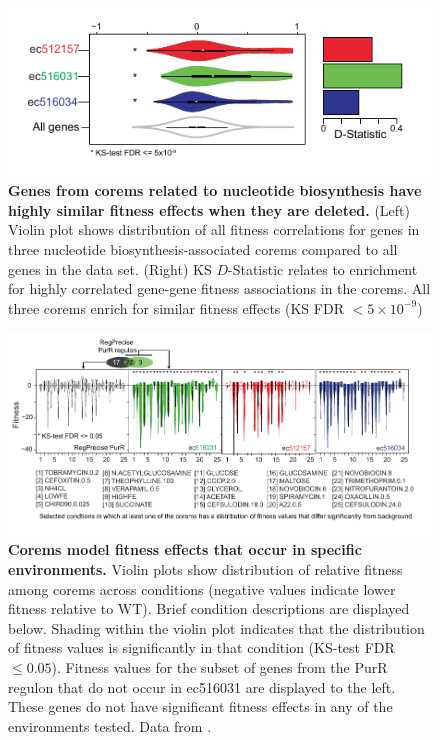\begin{figure}[hp]
\centering
\includegraphics[width=0.95\linewidth]{figures/purR_corem_fitness.pdf}
\caption[Genes from corems related to nucleotide biosynthesis have highly similar fitness effects when they are deleted]{\textbf{Genes from corems related to nucleotide biosynthesis have highly similar fitness effects when they are deleted.} (Left) Violin plot shows distribution of all fitness correlations for genes in three nucleotide biosynthesis-associated corems compared to all genes in the data set. (Right) KS $D$-Statistic relates to enrichment for highly correlated gene-gene fitness associations in the corems. All three corems enrich for similar fitness effects (KS FDR $< 5\times 10^{-9}$)}
\label{fig:purR_corem_fitness}
\end{figure}

\begin{figure}[hp]
\centering
\includegraphics[width=0.95\linewidth]{figures/purR_corem_fitness_specific.pdf}
\caption[Corems model fitness effects that occur in specific environments]{\textbf{Corems model fitness effects that occur in specific environments.} Violin plots show distribution of relative fitness among corems across conditions (negative values indicate lower fitness relative to WT). Brief condition descriptions are displayed below. Shading within the violin plot indicates that the distribution of fitness values is significantly in that condition (KS-test FDR $\leq 0.05$). Fitness values for the subset of genes from the PurR regulon that do not occur in ec516031 are displayed to the left. These genes do not have significant fitness effects in any of the environments tested. Data from \cite{Nichols2011}.}
\label{fig:purR_corem_fitness_specific}
\end{figure}

